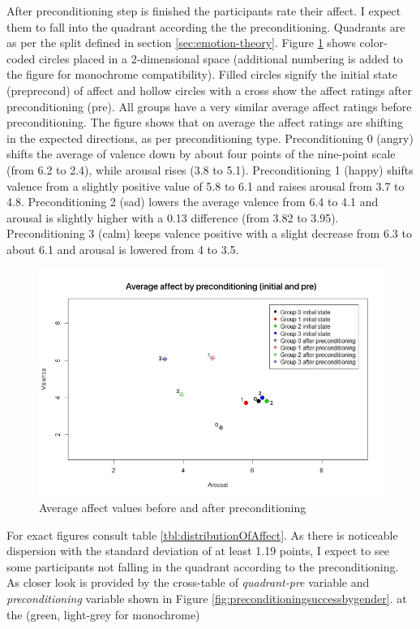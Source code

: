 		After preconditioning step is finished the participants rate their affect. I expect them to fall into the quadrant according the the preconditioning. Quadrants are as per the split defined in section \ref{sec:emotion-theory}. Figure \ref{fig:after-preconditioning-avg} shows color-coded circles placed in a 2-dimensional space (additional numbering is added to the figure for monochrome compatibility). Filled circles signify the initial state (preprecond) of affect and hollow circles with a cross show the affect ratings after preconditioning (pre). All groups have a very similar average affect ratings before preconditioning.
		The figure shows that on average the affect ratings are shifting in the expected directions, as per preconditioning type. 
		Preconditioning 0 (angry) shifts the average of valence down by about four points of the nine-point scale (from 6.2 to 2.4), while arousal rises (3.8 to 5.1). Preconditioning 1 (happy) shifts valence from a slightly positive value of 5.8 to 6.1 and raises arousal from 3.7 to 4.8. 
		Preconditioning 2 (sad) lowers the average valence from 6.4 to 4.1 and arousal is slightly higher with a 0.13 difference (from 3.82 to 3.95).
		Preconditioning 3 (calm) keeps valence positive with a slight decrease from 6.3 to about 6.1 and arousal is lowered from 4 to 3.5.
		
\begin{figure}[h!]
	\centering
	\includegraphics[width=1\linewidth]{graphics/after-preconditioning-avg}
	\caption[Avg Affect]{Average affect values before and after preconditioning}
	\label{fig:after-preconditioning-avg}
\end{figure}
		
		For exact figures consult table \ref{tbl:distributionOfAffect}. As there is noticeable dispersion with the standard deviation of at least 1.19 points, I expect to see some participants not falling in the quadrant according to the preconditioning. As closer look is provided by the cross-table of \textit{quadrant-pre} variable and \textit{preconditioning} variable shown in Figure \ref{fig:preconditioningsuccessbygender}.  at the  (green, light-grey for monochrome) 
		
